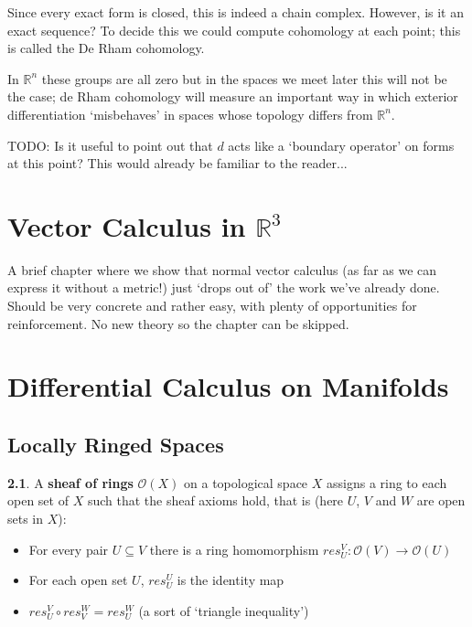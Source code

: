 \documentclass[oneside,english]{amsbook}
\numberwithin{section}{chapter}
\theoremstyle{plain}
\theoremstyle{definition}
\newtheorem{defn}[thm]{\protect\definitionname}
\providecommand{\definitionname}{Definition}
\begin{document}
			Since every exact form is closed, this is indeed a chain complex. However, is it an exact sequence? To decide this we could compute cohomology at each point; this is called the De Rham cohomology. 
			
			In $\mathbb{R}^n$ these groups are all zero but in the spaces we meet later this will not be the case; de Rham cohomology will measure an important way in which exterior differentiation `misbehaves' in spaces whose topology differs from $\mathbb{R}^n$.

			TODO: Is it useful to point out that $d$ acts like a `boundary operator' on forms at this point? This would already be familiar to the reader...
			
	\chapter{Vector Calculus in $\mathbb{R}^3$}

		A brief chapter where we show that normal vector calculus (as far as we can express it without a metric!) just `drops out of' the work we've already done. Should be very concrete and rather easy, with plenty of opportunities for reinforcement. No new theory so the chapter can be skipped.

	\chapter{Differential Calculus on Manifolds}
	
		\section{Locally Ringed Spaces}

			\begin{defn} 
				A \textbf{sheaf of rings} $\mathscr{O}(X)$ on a topological space $X$ assigns a ring to each open set of $X$ such that the sheaf axioms hold, that is (here $U$, $V$ and $W$ are open sets in $X$):
				\begin{itemize}
					\item For every pair $U\subseteq V$ there is a ring homomorphism $res_U^V: \mathscr{O}(V)\to \mathscr{O}(U)$
					\item For each open set $U$, $res_U^U$ is the identity map
					\item $res_U^V \circ res_V^W = res_U^W$ (a sort of `triangle inequality')
				\end{itemize}
			\end{defn}
			
\end{document}
